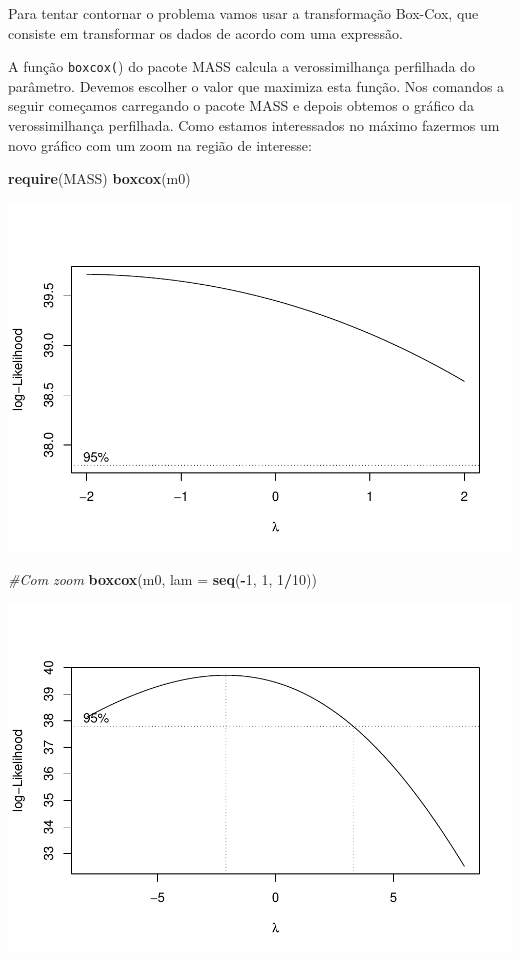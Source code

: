 \documentclass[
]{book}
\newenvironment{Shaded}{\begin{snugshade}}{\end{snugshade}}
\newcommand{\CommentTok}[1]{\textcolor[rgb]{0.56,0.35,0.01}{\textit{#1}}}
\newcommand{\DataTypeTok}[1]{\textcolor[rgb]{0.13,0.29,0.53}{#1}}
\newcommand{\DecValTok}[1]{\textcolor[rgb]{0.00,0.00,0.81}{#1}}
\newcommand{\KeywordTok}[1]{\textcolor[rgb]{0.13,0.29,0.53}{\textbf{#1}}}
\newcommand{\NormalTok}[1]{#1}
\newcommand{\OperatorTok}[1]{\textcolor[rgb]{0.81,0.36,0.00}{\textbf{#1}}}
\begin{document}
Para tentar contornar o problema vamos usar a transformação Box-Cox, que consiste em transformar os dados de acordo com uma expressão.

A função \texttt{boxcox(}) do pacote MASS calcula a verossimilhança perfilhada do parâmetro. Devemos escolher o valor que maximiza esta função. Nos comandos a seguir começamos carregando o pacote MASS e depois obtemos o gráfico da verossimilhança perfilhada. Como estamos interessados no máximo fazermos um novo gráfico com um zoom na região de interesse:

\begin{Shaded}
\begin{Highlighting}[]
\KeywordTok{require}\NormalTok{(MASS) }
  \KeywordTok{boxcox}\NormalTok{(m0)}
\end{Highlighting}
\end{Shaded}

\includegraphics{TudodoR_files/figure-latex/unnamed-chunk-291-1.pdf}

\begin{Shaded}
\begin{Highlighting}[]
  \CommentTok{#Com zoom}
  \KeywordTok{boxcox}\NormalTok{(m0, }\DataTypeTok{lam =} \KeywordTok{seq}\NormalTok{(}\OperatorTok{-}\DecValTok{1}\NormalTok{, }\DecValTok{1}\NormalTok{, }\DecValTok{1}\OperatorTok{/}\DecValTok{10}\NormalTok{))}
\end{Highlighting}
\end{Shaded}

\includegraphics{TudodoR_files/figure-latex/unnamed-chunk-291-2.pdf}
\end{document}
